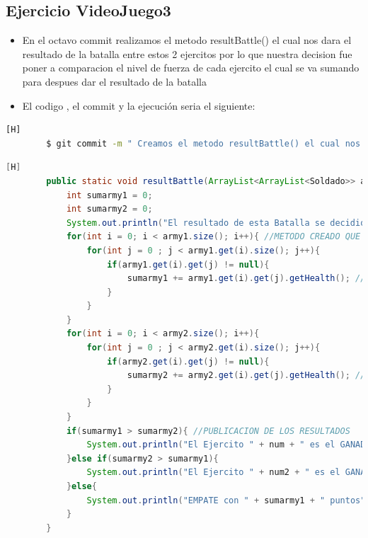 \documentclass{article}
\begin{document}
	\subsection{Ejercicio VideoJuego3}
	\begin{itemize}	
		\item En el octavo commit realizamos el metodo resultBattle() el cual nos dara el resultado de la batalla entre estos 2 ejercitos por lo que nuestra decision fue poner a comparacion el nivel de fuerza de cada ejercito el cual se va sumando para despues dar el resultado de la batalla
		\item El codigo , el commit  y la ejecución seria el siguiente:
	\end{itemize}	
	\begin{lstlisting}[language=bash,caption={Commit}][H]
		$ git commit -m " Creamos el metodo resultBattle() el cual nos dara el resultado de la batalla entre estos 2 ejercitos por lo que nuestra decision fue poner a comparacion el nivel de fuerza de cada ejercito el cual se va sumando para despues dar el resultado de la batalla"
	\end{lstlisting}	
	\begin{lstlisting}[language=java,caption={Las lineas de codigos del metodo creado:}][H]
		public static void resultBattle(ArrayList<ArrayList<Soldado>> army1, ArrayList<ArrayList<Soldado>> army2, int num, int num2){
			int sumarmy1 = 0;
			int sumarmy2 = 0;
			System.out.println("El resultado de esta Batalla se decidio por el nivel de fuerza de cada ejercito por lo que el resultado es: ...");
			for(int i = 0; i < army1.size(); i++){ //METODO CREADO QUE NOS PERMITE DAR CON UN GANADOR ESTO GRACIAS AL NIVEL DE PUNTOS DE VIDA O FUERZA DE CADA EJERCITO EL CUAL VAMOS SUMANDO DE CADA EJERCITO PARA DESPUES COMPARARLOS Y DECIDIR EL RESULTADO DE ESTA BATALLA
				for(int j = 0 ; j < army1.get(i).size(); j++){
					if(army1.get(i).get(j) != null){
						sumarmy1 += army1.get(i).get(j).getHealth(); //SUMA DE PUNTOS DEL EJERCITO 1
					}
				}
			}
			for(int i = 0; i < army2.size(); i++){
				for(int j = 0 ; j < army2.get(i).size(); j++){
					if(army2.get(i).get(j) != null){
						sumarmy2 += army2.get(i).get(j).getHealth(); //SUMA DE PUNTOS DEL EJERCITO 2
					}
				}
			}
			if(sumarmy1 > sumarmy2){ //PUBLICACION DE LOS RESULTADOS
				System.out.println("El Ejercito " + num + " es el GANADOR con " + sumarmy1 + " puntos");
			}else if(sumarmy2 > sumarmy1){
				System.out.println("El Ejercito " + num2 + " es el GANADOR con " + sumarmy2 + " puntos");
			}else{
				System.out.println("EMPATE con " + sumarmy1 + " puntos");
			}
		}
	\end{lstlisting}
\end{document}
